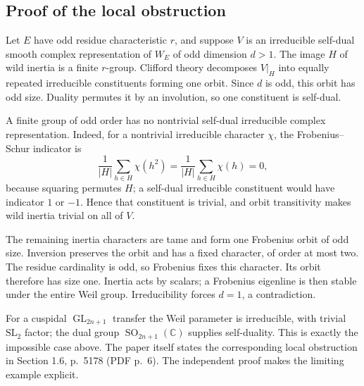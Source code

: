 \documentclass[10pt]{article}
\begin{document}
\subsection*{Proof of the local obstruction}
Let \(E\) have odd residue characteristic \(r\), and suppose \(V\) is an irreducible self-dual smooth complex representation of \(W_E\) of odd dimension \(d>1\). The image \(H\) of wild inertia is a finite \(r\)-group. Clifford theory decomposes \(V|_H\) into equally repeated irreducible constituents forming one orbit. Since \(d\) is odd, this orbit has odd size. Duality permutes it by an involution, so one constituent is self-dual.\par
A finite group of odd order has no nontrivial self-dual irreducible complex representation. Indeed, for a nontrivial irreducible character \(\chi\), the Frobenius–Schur indicator is \[\frac{1}{|H|}\sum_{h\in H}\chi(h^2)
 =\frac{1}{|H|}\sum_{h\in H}\chi(h)=0,\] because squaring permutes \(H\); a self-dual irreducible constituent would have indicator \(1\) or \(-1\). Hence that constituent is trivial, and orbit transitivity makes wild inertia trivial on all of \(V\).\par
The remaining inertia characters are tame and form one Frobenius orbit of odd size. Inversion preserves the orbit and has a fixed character, of order at most two. The residue cardinality is odd, so Frobenius fixes this character. Its orbit therefore has size one. Inertia acts by scalars; a Frobenius eigenline is then stable under the entire Weil group. Irreducibility forces \(d=1\), a contradiction.\par
For a cuspidal \(\operatorname{GL}_{2n+1}\) transfer the Weil parameter is irreducible, with trivial \(\mathrm{SL}_2\) factor; the dual group \(\operatorname{SO}_{2n+1}(\mathbb C)\) supplies self-duality. This is exactly the impossible case above. The paper itself states the corresponding local obstruction in Section 1.6, p. 5178 (PDF p. 6). The independent proof makes the limiting example explicit.\par
\end{document}
